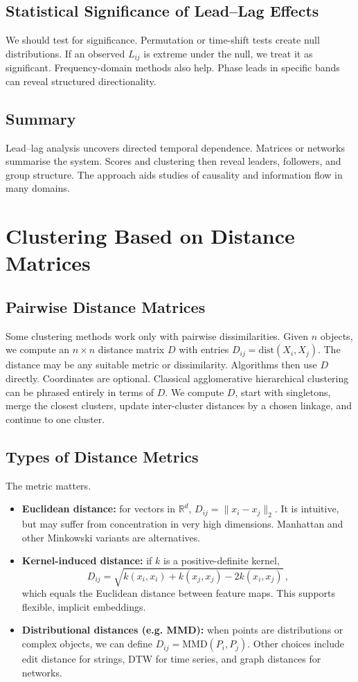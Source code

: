 \subsection{Statistical Significance of Lead–Lag Effects}
We should test for significance. Permutation or time-shift tests create null distributions. If an observed $L_{ij}$ is extreme under the null, we treat it as significant. Frequency-domain methods also help. Phase leads in specific bands can reveal structured directionality.

\subsection{Summary}
Lead–lag analysis uncovers directed temporal dependence. Matrices or networks summarise the system. Scores and clustering then reveal leaders, followers, and group structure. The approach aids studies of causality and information flow in many domains.

\section{Clustering Based on Distance Matrices}

\subsection{Pairwise Distance Matrices}
Some clustering methods work only with pairwise dissimilarities. Given $n$ objects, we compute an $n\times n$ distance matrix $D$ with entries $D_{ij}=\mathrm{dist}(X_i,X_j)$. The distance may be any suitable metric or dissimilarity. Algorithms then use $D$ directly. Coordinates are optional. Classical agglomerative hierarchical clustering can be phrased entirely in terms of $D$. We compute $D$, start with singletons, merge the closest clusters, update inter-cluster distances by a chosen linkage, and continue to one cluster.

\subsection{Types of Distance Metrics}
The metric matters.
\begin{itemize}
    \item \textbf{Euclidean distance:} for vectors in $\mathbb{R}^d$, $D_{ij}=\|x_i-x_j\|_2$. It is intuitive, but may suffer from concentration in very high dimensions. Manhattan and other Minkowski variants are alternatives.
    \item \textbf{Kernel-induced distance:} if $k$ is a positive-definite kernel,
    \[
      D_{ij}=\sqrt{k(x_i,x_i)+k(x_j,x_j)-2k(x_i,x_j)}\,,
    \]
    which equals the Euclidean distance between feature maps. This supports flexible, implicit embeddings.
    \item \textbf{Distributional distances (e.g. MMD):} when points are distributions or complex objects, we can define $D_{ij}=\mathrm{MMD}(P_i,P_j)$. Other choices include edit distance for strings, DTW for time series, and graph distances for networks.
\end{itemize}

